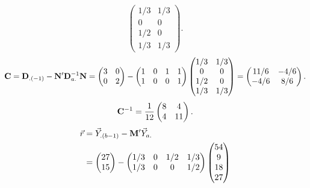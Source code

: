 \begin{Example}{}{}
\[\begin{pmatrix}
            1/3 & 1/3 \\
            0   & 0   \\
            1/2 & 0   \\
            1/3 & 1/3
        \end{pmatrix}. \]
    \[ \mathbf{C}=\mathbf{D}_{.(-1)}-\mathbf{N}'\mathbf{D}_{a.}^{-1}\mathbf{N}=
        \begin{pmatrix}
            3 & 0 \\
            0 & 2
        \end{pmatrix}-\begin{pmatrix}
            1 & 0 & 1 & 1 \\
            1 & 0 & 0 & 1
        \end{pmatrix}\begin{pmatrix}
            1/3 & 1/3 \\
            0   & 0   \\
            1/2 & 0   \\
            1/3 & 1/3
        \end{pmatrix}=\begin{pmatrix}
            11/6 & -4/6 \\
            -4/6 & 8/6
        \end{pmatrix}. \]
    \[ \mathbf{C}^{-1}=\frac{1}{12}\begin{pmatrix}
            8 & 4  \\
            4 & 11
        \end{pmatrix}. \]
    \begin{align*}
        \vec{r}
         & =\vec{Y}_{.(b-1)}-\mathbf{M}'\vec{Y}_{a.}          \\
         & =\begin{pmatrix}
                27 \\
                15
            \end{pmatrix}-\begin{pmatrix}
                              1/3 & 0 & 1/2 & 1/3 \\
                              1/3 & 0 & 0   & 1/2
                          \end{pmatrix}\begin{pmatrix}
                                           54 \\
                                           9  \\
                                           18 \\
                                           27

\end{pmatrix}
\end{align*}
\end{Example}
